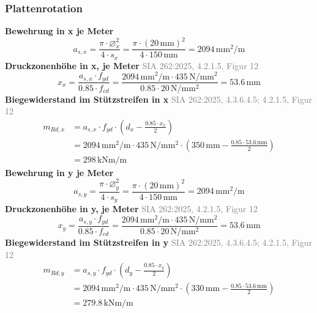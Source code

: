 \documentclass[11pt,a4paper]{article}
\newcommand{\normref}[1]{{\small\textcolor{gray}{#1}}}
\begin{document}
\subsubsection{Plattenrotation}
\noindent\textbf{Bewehrung in x je Meter}
\begin{equation*}
a_{s,x} = \frac{\pi \cdot \varnothing_x^{2}}{4 \cdot s_x} = \frac{\pi \cdot \left(20\,\mathrm{mm}\right)^{2}}{4 \cdot 150\,\mathrm{mm}} = 2094\,\mathrm{mm}^{2}/\mathrm{m}
\end{equation*}
\noindent\textbf{Druckzonenhöhe in x, je Meter} \hfill \normref{SIA 262:2025, 4.2.1.5, Figur 12}
\begin{equation*}
x_x = \frac{a_{s,x} \cdot f_{yd}}{0.85 \cdot f_{cd}} = \frac{2094\,\mathrm{mm}^{2}/\mathrm{m} \cdot 435\,\mathrm{N}/\mathrm{mm}^{2}}{0.85 \cdot 20\,\mathrm{N}/\mathrm{mm}^{2}} = 53.6\,\mathrm{mm}
\end{equation*}
\noindent\textbf{Biegewiderstand im Stützstreifen in x} \hfill \normref{SIA 262:2025, 4.3.6.4.5; 4.2.1.5, Figur 12}
\begin{equation*}
\begin{aligned}
  m_{Rd,x} &= a_{s,x} \cdot f_{yd} \cdot \left(d_x - \frac{0.85 \cdot x_x}{2}\right) \\
  &= 2094\,\mathrm{mm}^{2}/\mathrm{m} \cdot 435\,\mathrm{N}/\mathrm{mm}^{2} \cdot \left(350\,\mathrm{mm} - \frac{0.85 \cdot 53.6\,\mathrm{mm}}{2}\right) \\
  &= 298\,\mathrm{kNm}/\mathrm{m}
\end{aligned}
\end{equation*}
\noindent\textbf{Bewehrung in y je Meter}
\begin{equation*}
a_{s,y} = \frac{\pi \cdot \varnothing_y^{2}}{4 \cdot s_y} = \frac{\pi \cdot \left(20\,\mathrm{mm}\right)^{2}}{4 \cdot 150\,\mathrm{mm}} = 2094\,\mathrm{mm}^{2}/\mathrm{m}
\end{equation*}
\noindent\textbf{Druckzonenhöhe in y, je Meter} \hfill \normref{SIA 262:2025, 4.2.1.5, Figur 12}
\begin{equation*}
x_y = \frac{a_{s,y} \cdot f_{yd}}{0.85 \cdot f_{cd}} = \frac{2094\,\mathrm{mm}^{2}/\mathrm{m} \cdot 435\,\mathrm{N}/\mathrm{mm}^{2}}{0.85 \cdot 20\,\mathrm{N}/\mathrm{mm}^{2}} = 53.6\,\mathrm{mm}
\end{equation*}
\noindent\textbf{Biegewiderstand im Stützstreifen in y} \hfill \normref{SIA 262:2025, 4.3.6.4.5; 4.2.1.5, Figur 12}
\begin{equation*}
\begin{aligned}
  m_{Rd,y} &= a_{s,y} \cdot f_{yd} \cdot \left(d_y - \frac{0.85 \cdot x_y}{2}\right) \\
  &= 2094\,\mathrm{mm}^{2}/\mathrm{m} \cdot 435\,\mathrm{N}/\mathrm{mm}^{2} \cdot \left(330\,\mathrm{mm} - \frac{0.85 \cdot 53.6\,\mathrm{mm}}{2}\right) \\
  &= 279.8\,\mathrm{kNm}/\mathrm{m}
\end{aligned}
\end{equation*}
\end{document}
